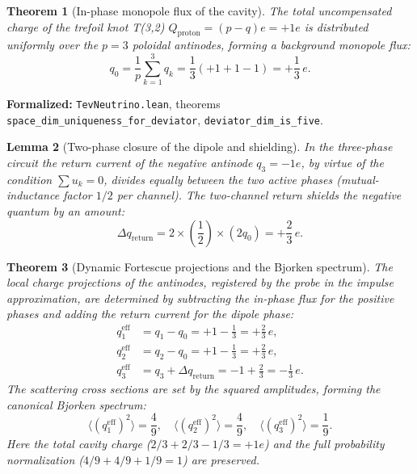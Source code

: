 \documentclass[11pt,a4paper]{article}
\newtheorem{theorem}{Theorem}
\newtheorem{lemma}[theorem]{Lemma}
\theoremstyle{definition}
\theoremstyle{remark}
\begin{document}
\begin{theorem}[In-phase monopole flux of the cavity]
\label{thm:fortescue_monopole_flux}
The total uncompensated charge of the trefoil knot T(3,2) $Q_{\mathrm{proton}} = (p - q)e = +1e$ is distributed uniformly over the $p = 3$ poloidal antinodes, forming a background monopole flux:
\begin{equation}
q_0 = \frac{1}{p} \sum_{k=1}^3 q_k = \frac{1}{3} (+1 + 1 - 1) = +\frac{1}{3} \, e.
\label{eq:fortescue_monopole_flux}
\end{equation}
\end{theorem}

\noindent\small\textbf{Formalized:} \texttt{TevNeutrino.lean}, theorems \texttt{space_dim_uniqueness_for_deviator}, \texttt{deviator_dim_is_five}.

\begin{lemma}[Two-phase closure of the dipole and shielding]
\label{lem:dipole_return_shielding}
In the three-phase circuit the return current of the negative antinode $q_3 = -1e$, by virtue of the condition $\sum u_k = 0$, divides equally between the two active phases (mutual-inductance factor $1/2$ per channel). The two-channel return shields the negative quantum by an amount:
\begin{equation}
\Delta q_{\mathrm{return}} = 2 \times \left(\frac{1}{2}\right) \times (2 q_0) = +\frac{2}{3} \, e.
\label{eq:dipole_return_formula}
\end{equation}
\end{lemma}

\begin{theorem}[Dynamic Fortescue projections and the Bjorken spectrum]
\label{thm:fortescue_charges}
The local charge projections of the antinodes, registered by the probe in the impulse approximation, are determined by subtracting the in-phase flux for the positive phases and adding the return current for the dipole phase:
\begin{align}
q_1^{\mathrm{eff}} &= q_1 - q_0 = +1 - \frac{1}{3} = +\frac{2}{3} \, e, \label{eq:q_eff_1} \\
q_2^{\mathrm{eff}} &= q_2 - q_0 = +1 - \frac{1}{3} = +\frac{2}{3} \, e, \label{eq:q_eff_2} \\
q_3^{\mathrm{eff}} &= q_3 + \Delta q_{\mathrm{return}} = -1 + \frac{2}{3} = -\frac{1}{3} \, e. \label{eq:q_eff_3}
\end{align}
The scattering cross sections are set by the squared amplitudes, forming the canonical Bjorken spectrum:
\begin{equation}
\langle (q_1^{\mathrm{eff}})^2 \rangle = \frac{4}{9}, \quad
\langle (q_2^{\mathrm{eff}})^2 \rangle = \frac{4}{9}, \quad
\langle (q_3^{\mathrm{eff}})^2 \rangle = \frac{1}{9}.
\label{eq:bjorken_weights_squares}
\end{equation}
Here the total cavity charge ($2/3 + 2/3 - 1/3 = +1e$) and the full probability normalization ($4/9 + 4/9 + 1/9 = 1$) are preserved.
\end{theorem}
\end{document}
